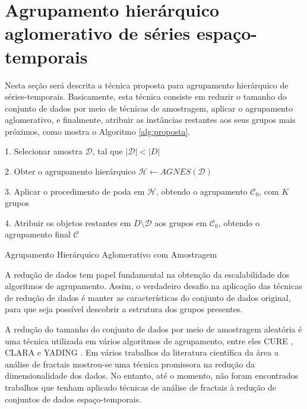\section{Agrupamento hierárquico aglomerativo de séries espaço-temporais}
	\label{sec:agrupamento_hierarquico}

Nesta seção será descrita a técnica proposta para agrupamento hierárquico de
séries-temporais. Basicamente, esta técnica consiste em reduzir o tamanho do
conjunto de dados por meio de técnicas de amostragem, aplicar o agrupamento
aglomerativo, e finalmente, atribuir as instâncias restantes aos seus grupos
mais próximos, como mostra o Algoritmo \ref{alg:proposta}.

\begin{algorithm}
	1. Selecionar amostra $\mathcal{D}$,
		tal que $\left|\mathcal{D}\right| < \left|D\right|$ \;
		
	2. Obter o agrupamento hierárquico
		$\mathcal{H} \gets AGNES\left(\mathcal{D}\right)$ \;
		
	3. Aplicar o procedimento de poda em $\mathcal{H}$, obtendo
		o agrupamento $\mathcal{C}_0$, com $K$ grupos \;
		
	4. Atribuir os objetos restantes em $D \setminus \mathcal{D}$
		aos grupos em $\mathcal{C}_0$, obtendo o agrupamento final $\mathcal{C}$ \;
	
	\caption{Agrupamento Hierárquico Aglomerativo com Amostragem}
	\label{alg:proposta}
\end{algorithm}

A redução de dados tem papel fundamental na obtenção da escalabilidade dos
algoritmos de agrupamento. Assim, o verdadeiro desafio na aplicação das técnicas
de redução de dados é manter as características do conjunto de dados original,
para que seja possível descobrir a estrutura dos grupos presentes.

A redução do tamanho do conjunto de dados por meio de amostragem aleatória é uma
técnica utilizada em vários algoritmos de agrupamento, entre eles CURE
\cite{guha1998cure}, CLARA \cite{kaufman1990finding} e YADING \cite{Ding2015}.
Em vários trabalhos da literatura científica da área a análise de fractais mostrou-se uma técnica promissora na 
redução da dimensionalidade dos dados. No entanto, até o momento, não foram
encontrados trabalhos que tenham aplicado técnicas de análise de fractais à
redução de conjuntos de dados espaço-temporais.
